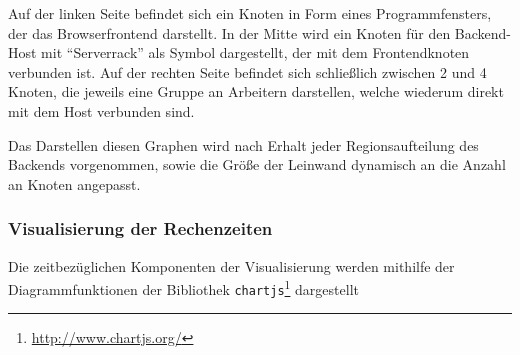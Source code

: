 Auf der linken Seite befindet sich ein Knoten in Form eines Programmfensters, der das Browserfrontend darstellt.
In der Mitte wird ein Knoten für den Backend-Host mit \enquote{Serverrack} als Symbol dargestellt, der mit dem Frontendknoten verbunden ist.
Auf der rechten Seite befindet sich schließlich zwischen 2 und 4 Knoten, die jeweils eine Gruppe an Arbeitern
darstellen, welche wiederum direkt mit dem Host verbunden sind.

Das Darstellen diesen Graphen wird nach Erhalt jeder Regionsaufteilung des Backends vorgenommen,
sowie die Größe der Leinwand dynamisch an die Anzahl an Knoten angepasst.

\subsubsection{Visualisierung der Rechenzeiten} %
Die zeitbezüglichen Komponenten der Visualisierung werden mithilfe der Diagrammfunktionen
der Bibliothek \verb|chartjs|\footnote{\url{http://www.chartjs.org/}} dargestellt
